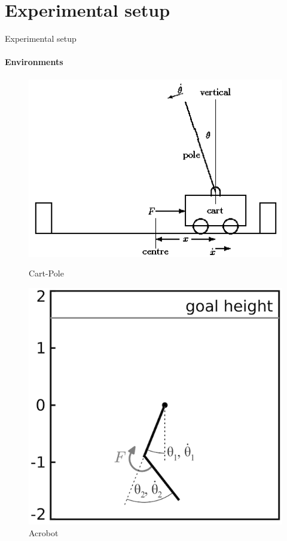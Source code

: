 \documentclass{beamer}
\begin{document}
\section{Experimental setup}
\begin{frame}[fragile]{Experimental setup}
\framesubtitle{Environments}
\begin{figure}[htb]
    \begin{minipage}{0.55\textwidth}
            \includegraphics[width=\linewidth]{cartpole.png}
            \caption{Cart-Pole}
    \end{minipage}\hfill
    \begin{minipage}{0.45\textwidth}
            \includegraphics[width=\linewidth]{acrobot.png}
            \caption{Acrobot}
    \end{minipage}
\end{figure}

\end{frame}
\end{document}
